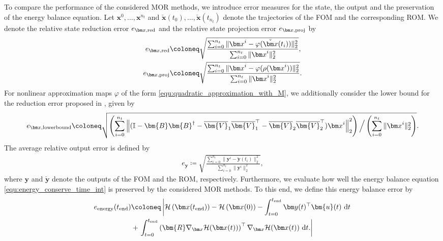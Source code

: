 \documentclass{article}
\newcommand{\bmV}{\bm{V}}
\newcommand{\bmB}{\bm{B}}
\newcommand{\curlyH}{\mathcal{H}}
\newcommand{\statex}{{\bm x}}
\newcommand{\outputy}{{\bm y}}
\newcommand{\stateRed}{\check{\bm x}}
\newcommand{\outputRed}{\check{\bm y}}
\newcommand{\statexT}{\statex(t)}
\newcommand{\outputyT}{\outputy(t)}
\newcommand{\inputu}{\bm{u}}
\newcommand{\snapsize}{n_t}
\newcommand{\approxfunc}{\varphi}
\newcommand{\funcR}{\bm{R}}
\newcommand{\VPODQMone}{\overline{\bmV}_{1}}
\newcommand{\VPODQMtwo}{\overline{\bmV}_{2}}
\newcommand{\FOM}{\textsf{FOM}\xspace}
\newcommand{\ROM}{\textsf{ROM}\xspace}
\newcommand{\MOR}{\textsf{MOR}\xspace}
\begin{document}
To compare the performance of the considered \MOR methods, we introduce error measures for the state, the output and the preservation of the energy balance equation. 
Let $\statex^0,\ldots,\statex^{\snapsize}$ and $
	\stateRed(t_0),\ldots,\stateRed(t_{\snapsize})$ denote the trajectories of the \FOM and the corresponding \ROM.
We denote the relative state reduction error $e_{\statex, {\rm red}}$ and the relative state projection error $e_{ \statex, {\rm proj}}$ by 
\begin{align}\label{eq:red_error}
	e_{\statex, {\rm red}} &\coloneq 
	\sqrt{
		\frac{\sum_{i=0}^{\snapsize}
			\|\statex^i-\approxfunc(\stateRed(t_i))\|_2^2
		}
		{
			\sum_{i=0}^{\snapsize}
			\|\statex^i\|_2^2
		}
	},
	\\ \label{eq:proj_error}
	e_{\statex, {\rm proj}}  &\coloneq 
	\sqrt{
		\frac{\sum_{i=0}^{\snapsize}
			\|\statex^i-\approxfunc(\rho(\statex^i))\|_2^2
		}
		{
			\sum_{i=0}^{\snapsize}
			\|\statex^i\|_2^2
		}
	}.
\end{align}
For nonlinear approximation maps $\approxfunc$ of the form \eqref{equ:quadratic_approximation_with_M}, we additionally consider the lower bound for the reduction error proposed in \cite{buchfink2024approximation}, given by 
\begin{align}
	\label{equ:non_app_lower_bound}
	e_{\statex,{\rm lowerbound}} \coloneq 
	\sqrt{
		\left(\sum_{i=0}^{\snapsize}
		\left\|
		(\mathbb{I} - \bmB\bmB^{\dagger}-\VPODQMone\VPODQMone^{\top} - \VPODQMtwo \VPODQMtwo^{\top})
		\statex^i
		\right\|_2^2
		\right)
		\Big/
		\left(
		\sum_{i=0}^{\snapsize}
		\|\statex^i\|_2^2
		\right)
	}
	.
\end{align}
The average relative output error is defined by
\begin{align}\label{eq:output_error}
	e_{\outputy} \coloneq 
	\sqrt{
		\frac{\sum_{i=0}^{\snapsize}
			\|\outputy^i-\outputRed(t_i)\|_2^2
		}
		{
			\sum_{i=0}^{\snapsize}
			\|\outputy^i\|_2^2
		}
	},
\end{align}
where $\outputy$ and $\outputRed$ denote the outputs of the \FOM and the \ROM, respectively. 
Furthermore, we evaluate how well the energy balance equation \eqref{equ:energy_conserve_time_int} is preserved by the considered \MOR methods. To this end, we define this energy balance error by  
\begin{align}
	\label{equ:def_energy_conserve_error}
	e_{\rm energy}({t_{\rm{end}}})&\coloneq \left| \curlyH\left(\statex({t_{\rm{end}}})\right)-\curlyH\left(\statex(0)\right)- {\int_{t=0}^{t_{\rm{end}}} {\outputyT^{\top}\inputu(t) \ {\rm d}t}} \right. \\
		 &+\left.	\int_{t=0}^{t_{\rm{end}}}\left(\funcR\nabla_{\statex}\curlyH(\statexT)\right)^{\top}\nabla_{\statex}\curlyH(\statexT) \ {\rm d}t . \notag \right| 
\end{align}
\end{document}

